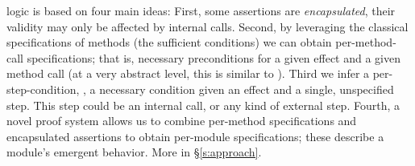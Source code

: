 { %


 
\Nec logic is based on four main ideas: 
First, some assertions are \emph{encapsulated}, \ie
their validity may only be affected by internal calls. 
Second, by leveraging the classical  specifications of methods 
(\ie the sufficient conditions) we can obtain per-method-call
 \Nec specifications; that is, necessary preconditions
  for a given effect and a given method call (at a very abstract level, this is
similar to ).
Third we infer a per-step-condition, \ie, a necessary condition given an effect and a single, unspecified step. This step could be an internal call, or any kind of external step.
Fourth,  a novel proof system allows us to combine 
per-method \Nec specifications and encapsulated assertions 
 to obtain per-module   \Nec specifications; these describe a module's
 emergent behavior.
More in \S\ref{s:approach}.
 
}
